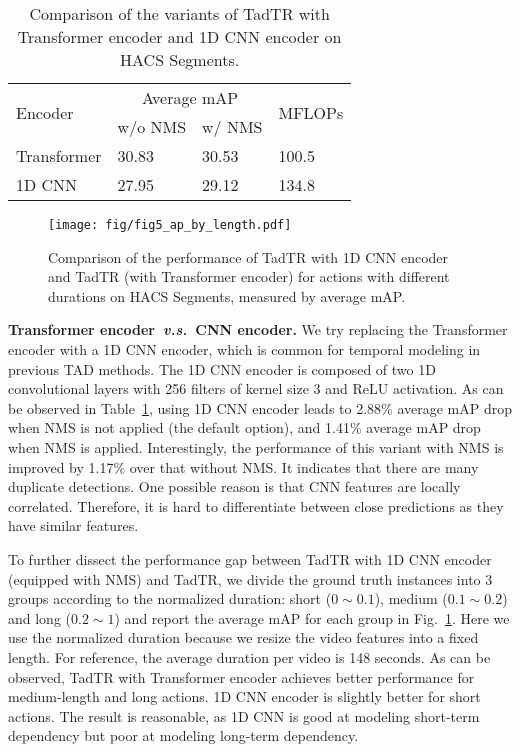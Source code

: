 \documentclass[lettersize,journal]{IEEEtran}
\begin{document}
\begin{table}[tb]
\caption{Comparison of the variants of TadTR with Transformer encoder and 1D CNN encoder on HACS Segments. 
}
\label{tab:hacs_encoder}
\centering
\begin{tabular}{p{2.2cm}|*{2}{p{1.6cm}<{\centering}}|p{1.6cm}<{\centering}}
\toprule
\multirow{2}{*}{Encoder}&\multicolumn{2}{c|}{Average mAP}&\multirow{2}{*}{MFLOPs} \\ \cline{2-3}
& w/o NMS & w/ NMS & \\
\midrule
Transformer & 30.83 & 30.53& 100.5\\
1D CNN &27.95 &29.12&134.8\\
\bottomrule
\end{tabular}
\end{table}

\begin{figure}[tb]
    \centering
    \texttt{[image: fig/fig5\_ap\_by\_length.pdf]}
    \caption{Comparison of the performance of TadTR with 1D CNN encoder and TadTR (with Transformer encoder) for actions with different durations on HACS Segments, measured by average mAP.}
    \label{fig:ap_by_length}
\end{figure}


\vspace{1ex}\noindent\textbf{Transformer encoder~\textit{v.s.}~CNN encoder.}
We try replacing the Transformer encoder with a 1D CNN encoder, which is common for temporal modeling in previous TAD methods. The 1D CNN encoder is composed of two 1D convolutional layers with 256 filters of kernel size 3 and ReLU activation. As can be observed in Table~\ref{tab:hacs_encoder}, using 1D CNN encoder leads to 2.88\% average mAP drop when NMS is not applied (the default option), and 1.41\% average mAP drop when NMS is applied. 
Interestingly, the performance of this variant with NMS is improved by 1.17\% over that without NMS. It indicates that there are many duplicate detections. One possible reason is that CNN features are locally correlated. Therefore, it is hard to differentiate between close predictions as they have similar features. 

To further dissect the performance gap between TadTR with 1D CNN encoder (equipped with NMS) and TadTR, we divide the ground truth instances into 3 groups according to the normalized duration: short ($0\sim0.1$), medium ($0.1\sim0.2$) and long ($0.2\sim1$) and report the average mAP for each group in Fig.~\ref{fig:ap_by_length}. 
Here we use the normalized duration because we resize the video features into a fixed length. For reference, the average duration per video is 148 seconds. As can be observed, TadTR with Transformer encoder achieves better performance for medium-length and long actions. 1D CNN encoder is slightly better for short actions. The result is reasonable, as 1D CNN is 
good at modeling short-term dependency but poor at modeling long-term dependency.
\end{document}
